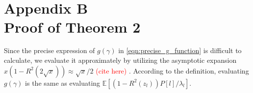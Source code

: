 \documentclass[12pt,draftclsnofoot,journal,onecolumn]{IEEEtran}
\theoremstyle{nonumberplain}
\def \ch {\textcolor{red}{(cite here) }}
\begin{document}
\section*{Appendix B\\Proof of Theorem 2}
    Since the precise expression of $g(\gamma)$ in \eqref{eqn:precise_g_function} is difficult to calculate, we evaluate it approximately by utilizing the asymptotic expansion $x(1-R^2(2\sqrt{x})) \approx \sqrt{x}/2$ \ch. According to the definition, evaluating $g(\gamma)$ is the same as evaluating $\mathbb{E}[(1-R^2(z_l))P[l]/\lambda_l]$. 
\end{document}
